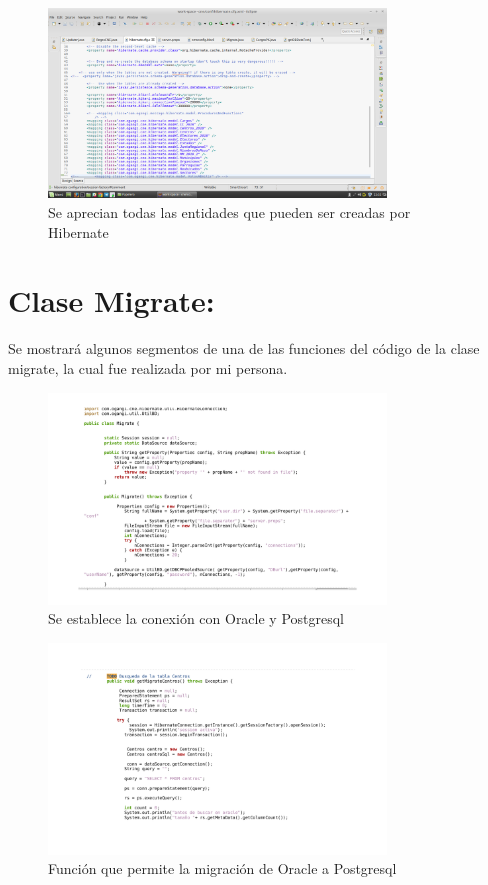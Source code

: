 \documentclass[12pt,oneside]{book}
\begin{document}
	\begin{figure}[H]
		\centering
		\includegraphics[width=0.8\textwidth]{hibernatexml2.png}
		\caption{Se aprecian todas las entidades que pueden ser creadas por Hibernate}
		\label{a1}
	\end{figure}

\section{Clase Migrate:}

Se mostrará algunos segmentos de una de las funciones del código de la clase migrate, la cual fue realizada por mi persona.

	\begin{figure}[H]
	\centering
	\includegraphics[width=0.8\textwidth]{migrate1.png}
	\caption{Se establece la conexión con Oracle y Postgresql}
	\label{q1}
\end{figure}

\begin{figure}[H]
	\centering
	\includegraphics[width=0.8\textwidth]{migrate2.png}
	\caption{Función que permite la migración de Oracle a Postgresql}
	\label{e1}
\end{figure}
\end{document}
